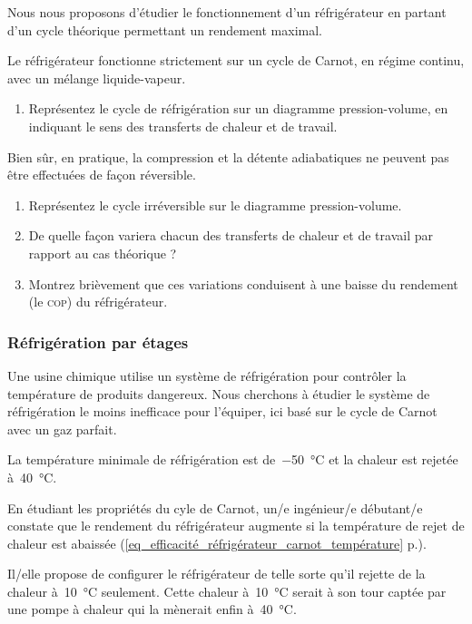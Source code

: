 	Nous nous proposons d’étudier le fonctionnement d’un réfrigérateur en partant d’un cycle théorique permettant un rendement maximal.
	
	Le réfrigérateur fonctionne strictement sur un cycle de Carnot, en régime continu, avec un mélange liquide-vapeur.
	
	\begin{enumerate}
		\item Représentez le cycle de réfrigération sur un diagramme pression-volume, en indiquant le sens des transferts de chaleur et de travail.
	\end{enumerate}
	
	Bien sûr, en pratique, la compression et la détente adiabatiques ne peuvent pas être effectuées de façon réversible.
	
	\begin{enumerate}
		\item Représentez le cycle irréversible sur le diagramme pression-volume.
		\item De quelle façon variera chacun des transferts de chaleur et de travail par rapport au cas théorique ?
		\item Montrez brièvement que ces variations conduisent à une baisse du rendement (le \textsc{cop}) du réfrigérateur.
	\end{enumerate}


\subsubsection{Réfrigération par étages}
\label{exo_refrigeration_etages}
\wherefrom{[DS n°2 2012, 7pts]}

	Une usine chimique utilise un système de réfrigération pour contrôler la température de produits dangereux. Nous cherchons à étudier le système de réfrigération le moins inefficace pour l’équiper, ici basé sur le cycle de Carnot avec un gaz parfait.
	
	La température minimale de réfrigération est de~\SI{-50}{\degreeCelsius} et la chaleur est rejetée à~\SI{40}{\degreeCelsius}.
			
	En étudiant les propriétés du cyle de Carnot, un/e ingénieur/e débutant/e constate que le rendement du réfrigérateur augmente si la température de rejet de chaleur est abaissée (\cref{eq_efficacité_réfrigérateur_carnot_température} p.\pageref{eq_efficacité_réfrigérateur_carnot_température}).
	
	Il/elle propose de configurer le réfrigérateur de telle sorte qu’il rejette de la chaleur à~\SI{10}{\degreeCelsius} seulement. Cette chaleur à~\SI{10}{\degreeCelsius} serait à son tour captée par une pompe à chaleur qui la mènerait enfin à~\SI{40}{\degreeCelsius}.
	
